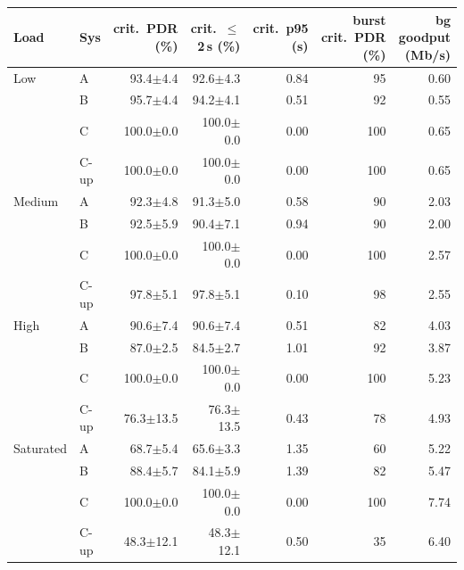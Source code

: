 \begin{tabular}{@{}llrrrrr@{}}\toprule
Load & Sys & crit.\ PDR (\%) & crit.\ $\le$2\,s (\%) & crit.\ p95 (s) & burst crit.\ PDR (\%) & bg goodput (Mb/s)\\\midrule
Low & A & 93.4$\pm$4.4 & 92.6$\pm$4.3 & 0.84 & 95 & 0.60\\
 & B & 95.7$\pm$4.4 & 94.2$\pm$4.1 & 0.51 & 92 & 0.55\\
 & C & 100.0$\pm$0.0 & 100.0$\pm$0.0 & 0.00 & 100 & 0.65\\
 & C-up & 100.0$\pm$0.0 & 100.0$\pm$0.0 & 0.00 & 100 & 0.65\\
\midrule
Medium & A & 92.3$\pm$4.8 & 91.3$\pm$5.0 & 0.58 & 90 & 2.03\\
 & B & 92.5$\pm$5.9 & 90.4$\pm$7.1 & 0.94 & 90 & 2.00\\
 & C & 100.0$\pm$0.0 & 100.0$\pm$0.0 & 0.00 & 100 & 2.57\\
 & C-up & 97.8$\pm$5.1 & 97.8$\pm$5.1 & 0.10 & 98 & 2.55\\
\midrule
High & A & 90.6$\pm$7.4 & 90.6$\pm$7.4 & 0.51 & 82 & 4.03\\
 & B & 87.0$\pm$2.5 & 84.5$\pm$2.7 & 1.01 & 92 & 3.87\\
 & C & 100.0$\pm$0.0 & 100.0$\pm$0.0 & 0.00 & 100 & 5.23\\
 & C-up & 76.3$\pm$13.5 & 76.3$\pm$13.5 & 0.43 & 78 & 4.93\\
\midrule
Saturated & A & 68.7$\pm$5.4 & 65.6$\pm$3.3 & 1.35 & 60 & 5.22\\
 & B & 88.4$\pm$5.7 & 84.1$\pm$5.9 & 1.39 & 82 & 5.47\\
 & C & 100.0$\pm$0.0 & 100.0$\pm$0.0 & 0.00 & 100 & 7.74\\
 & C-up & 48.3$\pm$12.1 & 48.3$\pm$12.1 & 0.50 & 35 & 6.40\\
\bottomrule\end{tabular}